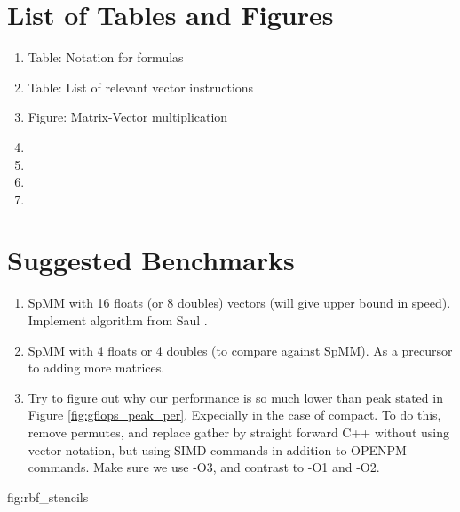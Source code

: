\section{List of Tables and Figures}
\begin{enumerate}
\item
Table: Notation for formulas
\item
Table: List of relevant vector instructions
\item
Figure: Matrix-Vector multiplication
\item
\item
\item
\item
\end{enumerate}

\section{Suggested Benchmarks}
\begin{enumerate}
\item
SpMM with 16 floats (or 8 doubles) vectors (will give upper bound in speed). Implement algorithm  from Saul \etal. 
\item
SpMM with 4 floats or 4 doubles (to compare against SpMM). As a precursor to adding more matrices. 
\item
Try to figure out why our performance is so much lower than peak stated in Figure \ref{fig:gflops_peak_per}.
Expecially in the case of compact. To do this, remove permutes, and replace gather by straight forward C++
without using vector notation, but using SIMD commands in addition to OPENPM commands. Make sure we use -O3, and contrast to -O1 and -O2. 
\end{enumerate}

{fig:rbf_stencils}


